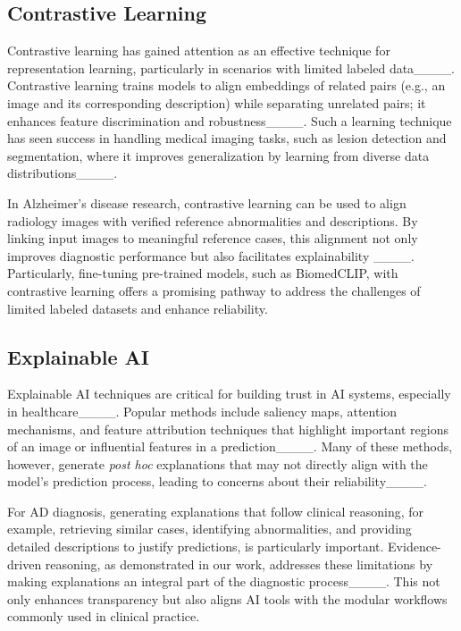 \subsection{Contrastive Learning}
Contrastive learning has gained attention as an effective technique for representation learning, particularly in scenarios with limited labeled data____. Contrastive learning trains models to align embeddings of related pairs (e.g., an image and its corresponding description) while separating unrelated pairs; it enhances feature discrimination and robustness____. Such a learning technique has seen success in handling medical imaging tasks, such as lesion detection and segmentation, where it improves generalization by learning from diverse data distributions____.

In Alzheimer's disease research, contrastive learning can be used to align radiology images with verified reference abnormalities and descriptions. By linking input images to meaningful reference cases, this alignment not only improves diagnostic performance but also facilitates explainability ____. Particularly, fine-tuning pre-trained models, such as BiomedCLIP, with contrastive learning offers a promising pathway to address the challenges of limited labeled datasets and enhance reliability.

\subsection{Explainable AI}
Explainable AI techniques are critical for building trust in AI systems, especially in healthcare____. Popular methods include saliency maps, attention mechanisms, and feature attribution techniques that highlight important regions of an image or influential features in a prediction____. Many of these methods, however, generate \textit{post hoc} explanations that may not directly align with the model's prediction process, leading to concerns about their reliability____.

For AD diagnosis, generating explanations that follow clinical reasoning, for example, retrieving similar cases, identifying abnormalities, and providing detailed descriptions to justify predictions, is particularly important. Evidence-driven reasoning, as demonstrated in our work, addresses these limitations by making explanations an integral part of the diagnostic process____. This not only enhances transparency but also aligns AI tools with the modular workflows commonly used in clinical practice.